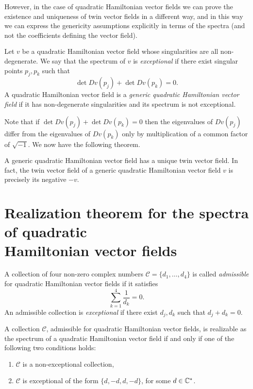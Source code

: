 \documentclass[phd,tocprelim]{cornell}
\begin{document}
However, in the case of quadratic Hamiltonian vector fields we can prove the existence and uniqueness of twin vector fields in a different way, and in this way we can express the genericity assumptions explicitly in terms of the spectra (and not the coefficients defining the vector field).

\begin{definition}
Let $v$ be a quadratic Hamiltonian vector field whose singularities are all non-degenerate. We say that the spectrum of $v$ is \emph{exceptional} if there exist singular points $p_j,p_k$ such that
\[ \det{Dv(p_j)}+\det{Dv(p_k)}=0. \]
A quadratic Hamiltonian vector field is a \emph{generic quadratic Hamiltonian vector field} if it has non-degenerate singularities and its spectrum is not exceptional.
\end{definition}

Note that if $\det{Dv(p_j)}+\det{Dv(p_k)}=0$ then the eigenvalues of $Dv(p_j)$ differ from the eigenvalues of $Dv(p_k)$ only by multiplication of a common factor of $\sqrt{-1}$. We now have the following theorem.

\begin{theorem}\label{thm:twinHam}
A generic quadratic Hamiltonian vector field has a unique twin vector field. In fact, the twin vector field of a generic quadratic Hamiltonian vector field $v$ is precisely its negative $-v$.
\end{theorem}





\section{Realization theorem for the spectra of quadratic\\Hamiltonian vector fields}

\begin{definition}
A collection of four non-zero complex numbers $\mathcal{C}=\{d_1,\ldots,d_4\}$ is called \emph{admissible} for quadratic Hamiltonian vector fields if it satisfies
\[ \sum_{k=1}^4 \frac{1}{d_k} = 0. \]
An admissible collection is \emph{exceptional} if there exist $d_j,d_k$ such that $d_j+d_k=0$.
\end{definition}

\begin{theorem}\label{thm:realization}
A collection $\mathcal{C}$, admissible for quadratic Hamiltonian vector fields, is realizable as the spectrum of a quadratic Hamiltonian vector field if and only if one of the following two conditions holds:
\begin{enumerate}
 \item $\mathcal{C}$ is a non-exceptional collection,
 \item $\mathcal{C}$ is exceptional of the form $\{d,-d,d,-d\}$, for some $d\in\mathbb{C}^{\ast}$.
\end{enumerate}
\end{theorem}
\end{document}
